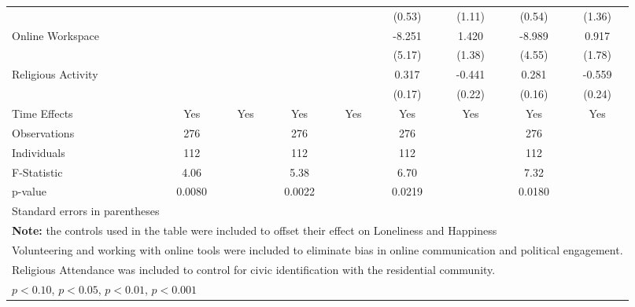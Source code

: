 \begin{table}[htbp]
\begin{tabular}{l*{8}{c}}
                              &              &              &              &              &(0.53)         &(1.11)         &(0.54)         &(1.36)         \\
\hspace{0.25cm} Online Workspace&              &              &              &              &-8.251         &1.420         &-8.989\sym{^+} &0.917         \\
                              &              &              &              &              &(5.17)         &(1.38)         &(4.55)         &(1.78)         \\
\hspace{0.25cm} Religious Activity&              &              &              &              &0.317\sym{^+} &-0.441\sym{^+} &0.281\sym{^+} &-0.559\sym{*}  \\
                              &              &              &              &              &(0.17)         &(0.22)         &(0.16)         &(0.24)         \\
Time Effects                  &  Yes         &  Yes         &  Yes         &  Yes         &  Yes         &  Yes         &  Yes         &  Yes         \\
\midrule
Observations                  &  276         &              &  276         &              &  276         &              &  276         &              \\
Individuals                   &  112         &              &  112         &              &  112         &              &  112         &              \\
F-Statistic                   & 4.06         &              & 5.38         &              & 6.70         &              & 7.32         &              \\
p-value                       &0.0080         &              &0.0022         &              &0.0219         &              &0.0180         &              \\
\bottomrule
\multicolumn{9}{l}{\footnotesize Standard errors in parentheses}\\
\multicolumn{9}{l}{\footnotesize \textbf{Note:} the controls used in the table were included to offset their effect on Loneliness and Happiness}\\
\multicolumn{9}{l}{\footnotesize Volunteering and working with online tools were included to eliminate bias in online communication and political engagement.}\\
\multicolumn{9}{l}{\footnotesize Religious Attendance was included to control for civic identification with the residential community.}\\
\multicolumn{9}{l}{\footnotesize \sym{^+} \(p<0.10\), \sym{*} \(p<0.05\), \sym{**} \(p<0.01\), \sym{***} \(p<0.001\)}\\
\end{tabular}
\end{table}
